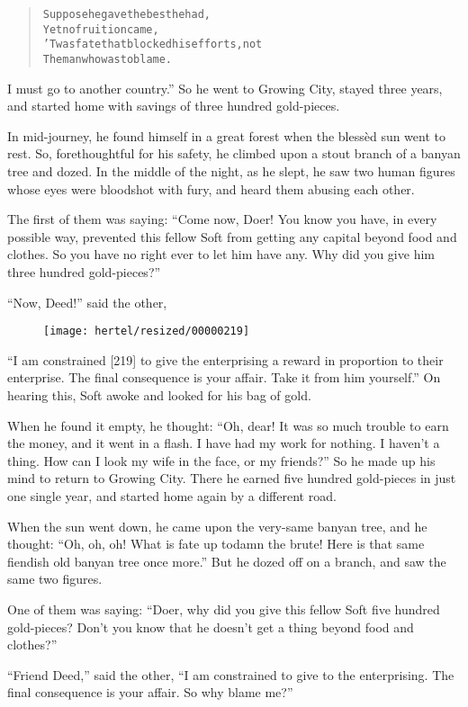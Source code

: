 \documentclass[article, twoside, 10pt]{memoir}
\renewenvironment{verbatim}{%
\begin{quote}%
\vskip -10pt%
\begin{alltt}\normalfont\small}{\end{alltt}%
\end{quote}%
\vskip -10pt
} %
\begin{document}
\begin{verbatim}
Suppose he gave the best he had,
    Yet no fruition came,
'Twas fate that blocked his efforts, not
    The man who was to blame.
\end{verbatim}
I must go to another country.” So he went to Growing City, stayed
three years, and started home with savings of three hundred
gold-pieces.

In mid-journey, he found himself in a great forest when the blessèd
sun went to rest. So, forethoughtful for his safety, he climbed
upon a stout branch of a banyan tree and dozed. In the middle of
the night, as he slept, he saw two human figures whose eyes were
bloodshot with fury, and heard them abusing each other.

The first of them was saying:
``Come now, Doer! You know you have, in every possible way, prevented this fellow Soft from getting any capital beyond food and clothes. So you have no right ever to let him have any. Why did you give him three hundred gold-pieces?''

``Now, Deed!'' said the other,
\begin{figure}[p]\texttt{[image: hertel/resized/00000219]}\end{figure}``I am constrained [219] to give the enterprising a reward in proportion to their enterprise. The final consequence is your affair. Take it from him yourself.''
On hearing this, Soft awoke and looked for his bag of gold.

When he found it empty, he thought:
``Oh, dear! It was so much trouble to earn the money, and it went in a flash. I have had my work for nothing. I haven't a thing. How can I look my wife in the face, or my friends?''
So he made up his mind to return to Growing City. There he earned
five hundred gold-pieces in just one single year, and started home
again by a different road.

When the sun went down, he came upon the very-same banyan tree, and
he thought:
``Oh, oh, oh! What is fate up to{\textemdash}damn the brute! Here is that same fiendish old banyan tree once more.''
But he dozed off on a branch, and saw the same two figures.

One of them was saying:
``Doer, why did you give this fellow Soft five hundred gold-pieces? Don't you know that he doesn't get a thing beyond food and clothes?''

``Friend Deed,'' said the other,
``I am constrained to give to the enterprising. The final consequence is your affair. So why blame me?''
\end{document}
